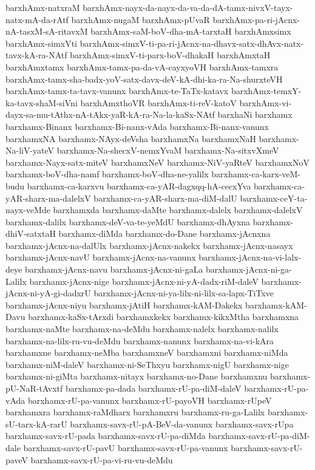 {barxhAmx-natxraM
barxhAmx-nayx-da-nayx-da-va-da-dA-tamx-nivxV-tayx-natx-mA-da-rAtf
barxhAmx-nugaM
barxhAmx-pUvaR
barxhAmx-pa-ri-jAcnx-nA-tasxM-sA-ritavxM
barxhAmx-saM-boV-dha-mA-tarxtaH
barxhAmxsimx
barxhAmx-simxVti
barxhAmx-simxV-ti-pa-ri-jAcnx-na-dhavx-satx-dhAvx-natx-tavx-kA-ra-NAtf
barxhAmx-simxV-ti-parx-boV-dhakaH
barxhAmxtaH
barxhAmxtamx
barxhAmx-tamx-pa-da-vA-cayxyoVH
barxhAmx-tamxra
barxhAmx-tamx-sha-badx-yoV-satx-davx-deV-kA-dhi-ka-ra-Na-shurxteVH
barxhAmx-tamx-ta-tavx-vanunx
barxhAmx-te-TaTx-katavx
barxhAmx-temxY-ka-tavx-shaM-siVni
barxhAmxthoVR
barxhAmx-ti-reV-katoV
barxhAmx-vi-dayx-sa-mu-tAthx-nA-tAkx-yaR-kA-ra-Na-la-kaSx-NAtf
barxhaNi
barxhamx
barxhamx-Binanx
barxhamx-Bi-nanx-vAda
barxhamx-Bi-nanx-vanunx
barxhamxNA
barxhamx-NAyx-deVsha
barxhamxNa
barxhamxNaH
barxhamx-Na-liV-yateV
barxhamx-Na-shecxV-nemxYvaM
barxhamx-Na-sitxvXmeV
barxhamx-Nayx-satx-miteV
barxhamxNeV
barxhamx-NiV-yaRteV
barxhamxNoV
barxhamx-boV-dha-namf
barxhamx-boV-dha-ne-yalilx
barxhamx-ca-karx-veM-budu
barxhamx-ca-karxvu
barxhamx-ca-yAR-dagxqq-hA-cecxYva
barxhamx-ca-yAR-sharx-ma-dalelxV
barxhamx-ca-yAR-sharx-ma-diM-dalU
barxhamx-ceY-ta-nayx-veMde
barxhamxda
barxhamx-daMte
barxhamx-dalelx
barxhamx-dalelxV
barxhamx-dalilx
barxhamx-deV-va-te-yeMdU
barxhamx-dhAyxna
barxhamx-dhiV-satxtaH
barxhamx-diMda
barxhamx-do-Dane
barxhamx-jAcnxna
barxhamx-jAcnx-na-dalUlx
barxhamx-jAcnx-nakekx
barxhamx-jAcnx-nasayx
barxhamx-jAcnx-navU
barxhamx-jAcnx-na-vanunx
barxhamx-jAcnx-na-vi-lalx-deye
barxhamx-jAcnx-navu
barxhamx-jAcnx-ni-gaLa
barxhamx-jAcnx-ni-ga-Lalilx
barxhamx-jAcnx-nige
barxhamx-jAcnx-ni-yA-dadx-riM-daleV
barxhamx-jAcnx-ni-yA-gi-dadxrU
barxhamx-jAcnx-ni-ya-lilx-ni-lilx-sa-lapx-TiTxve
barxhamx-jAcnx-niyu
barxhamx-jAtiH
barxhamx-kAM-Dakekx
barxhamx-kAM-Davu
barxhamx-kaSx-tArxdi
barxhamxkekx
barxhamx-kikxMtha
barxhamxna
barxhamx-naMte
barxhamx-na-deMdu
barxhamx-nalelx
barxhamx-nalilx
barxhamx-na-lilx-ru-vu-deMdu
barxhamx-nanunx
barxhamx-na-vi-kAra
barxhamxne
barxhamx-neMba
barxhamxneV
barxhamxni
barxhamx-niMda
barxhamx-niM-daleV
barxhamx-ni-SeThxyu
barxhamx-nigU
barxhamx-nige
barxhamx-ni-giMta
barxhamx-nitayx
barxhamx-no-Dane
barxhamxnu
barxhamx-pU-NaR-tAvxtf
barxhamx-pa-dada
barxhamx-rU-pa-diM-daleV
barxhamx-rU-pa-vAda
barxhamx-rU-pa-vanunx
barxhamx-rU-payoVH
barxhamx-rUpeV
barxhamxra
barxhamx-raMdharx
barxhamxru
barxhamx-ru-ga-Lalilx
barxhamx-sU-tarx-kA-rarU
barxhamx-savx-rU-pA-BeV-da-vanunx
barxhamx-savx-rUpa
barxhamx-savx-rU-pada
barxhamx-savx-rU-pa-diMda
barxhamx-savx-rU-pa-diM-dale
barxhamx-savx-rU-pavU
barxhamx-savx-rU-pa-vanunx
barxhamx-savx-rU-paveV
barxhamx-savx-rU-pa-vi-ru-vu-deMdu
}
